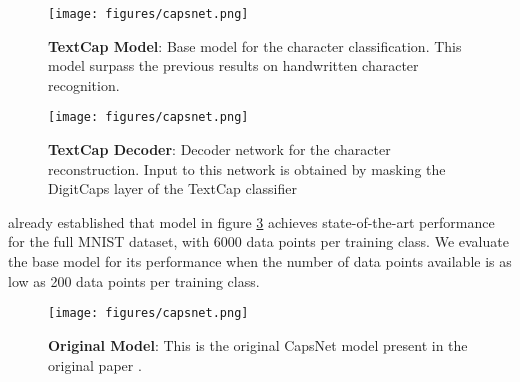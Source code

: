 \begin{figure}[h]
  \centering
  \texttt{[image: figures/capsnet.png]}
  \caption{\textbf{TextCap Model}: Base model for the character classification. This model surpass the previous results on handwritten character recognition. }

 \label{fig:base}
\end{figure}

\begin{figure}[h]
  \centering
  \texttt{[image: figures/capsnet.png]}
  \caption{\textbf{TextCap Decoder}: Decoder network for the character reconstruction. Input to this network is obtained by masking the DigitCaps layer of the TextCap classifier}

 \label{fig:decoder}
\end{figure}

\cite{sabour2017dynamic} already established that model in figure \ref{fig:capsnet} achieves state-of-the-art performance for the full MNIST dataset, with 6000 data points per training class. We evaluate the base model for its performance when the number of data points available is as low as 200 data points per training class.

\begin{figure}[h]
  \centering
  \texttt{[image: figures/capsnet.png]}
  \caption{\textbf{Original Model}: This is the original CapsNet model present in the original paper \cite{sabour2017dynamic}. }

 \label{fig:capsnet}
\end{figure}

